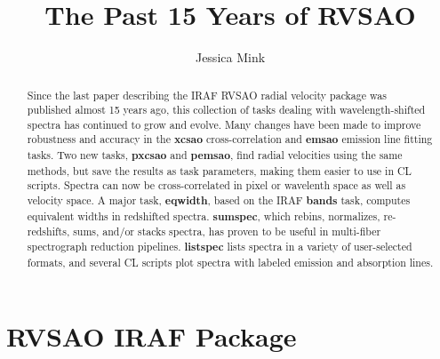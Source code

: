 
\resetcounters




\title{The Past 15 Years of RVSAO}
\author{Jessica Mink}


\begin{abstract}
Since the last paper describing the IRAF RVSAO radial velocity package was published almost 15 years ago, this collection of tasks dealing with wavelength-shifted spectra has continued to grow and evolve. Many changes have been made to improve robustness and accuracy in the \textbf{xcsao} cross-correlation and \textbf{emsao} emission line fitting tasks. Two new tasks, \textbf{pxcsao} and \textbf{pemsao}, find radial velocities using the same methods, but save the results as task parameters, making them easier to use in CL scripts.  Spectra can now be cross-correlated in pixel or wavelenth space as well as velocity space.  A major task, \textbf{eqwidth}, based on the IRAF \textbf{bands} task, computes equivalent widths in redshifted spectra. \textbf{sumspec}, which rebins, normalizes, re-redshifts, sums, and/or stacks spectra, has proven to be useful in multi-fiber spectrograph reduction pipelines.  \textbf{listspec} lists spectra in a variety of user-selected formats, and several CL scripts plot spectra with labeled emission and absorption lines. 

\end{abstract}

\section{RVSAO IRAF Package}

